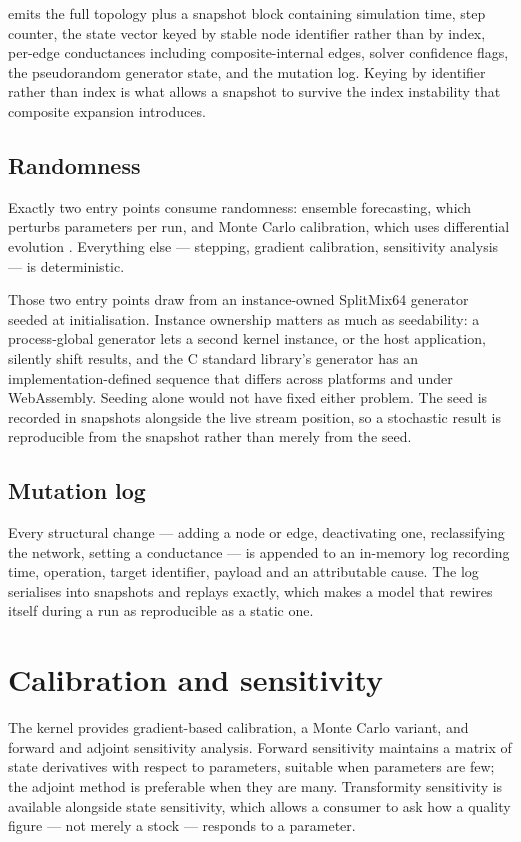 \documentclass[11pt,a4paper]{article}
\begin{document}
 emits the full topology plus a snapshot block containing simulation time, step counter, the state vector keyed by stable node identifier rather than by index, per-edge conductances including composite-internal edges, solver confidence flags, the pseudorandom generator state, and the mutation log. Keying by identifier rather than index is what allows a snapshot to survive the index instability that composite expansion introduces.

\subsection{Randomness}

Exactly two entry points consume randomness: ensemble forecasting, which perturbs parameters per run, and Monte Carlo calibration, which uses differential evolution \citep{storn1997}. Everything else --- stepping, gradient calibration, sensitivity analysis --- is deterministic.

Those two entry points draw from an instance-owned SplitMix64 generator \citep{steele2014} seeded at initialisation. Instance ownership matters as much as seedability: a process-global generator lets a second kernel instance, or the host application, silently shift results, and the C standard library's generator has an implementation-defined sequence that differs across platforms and under WebAssembly. Seeding alone would not have fixed either problem. The seed is recorded in snapshots alongside the live stream position, so a stochastic result is reproducible from the snapshot rather than merely from the seed.

\subsection{Mutation log}

Every structural change --- adding a node or edge, deactivating one, reclassifying the network, setting a conductance --- is appended to an in-memory log recording time, operation, target identifier, payload and an attributable cause. The log serialises into snapshots and replays exactly, which makes a model that rewires itself during a run as reproducible as a static one.

\section{Calibration and sensitivity}

The kernel provides gradient-based calibration, a Monte Carlo variant, and forward and adjoint sensitivity analysis. Forward sensitivity maintains a matrix of state derivatives with respect to parameters, suitable when parameters are few; the adjoint method is preferable when they are many. Transformity sensitivity is available alongside state sensitivity, which allows a consumer to ask how a quality figure --- not merely a stock --- responds to a parameter.
\end{document}
